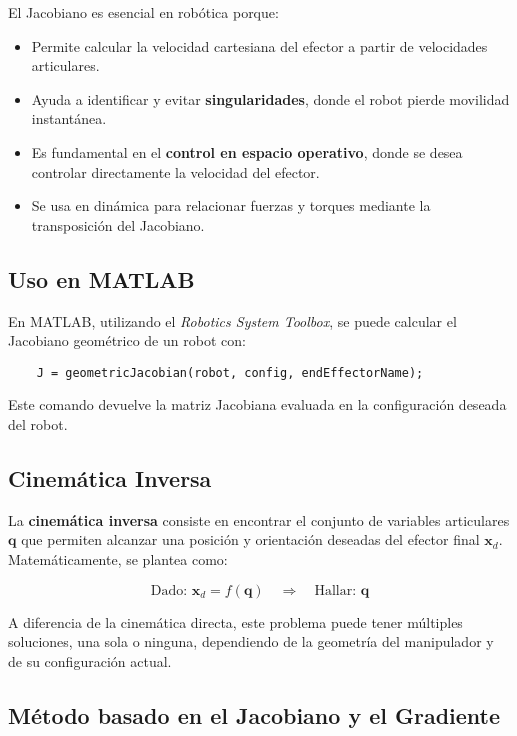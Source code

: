 El Jacobiano es esencial en robótica porque:
\begin{itemize}
	\item Permite calcular la velocidad cartesiana del efector a partir de velocidades articulares.
	\item Ayuda a identificar y evitar \textbf{singularidades}, donde el robot pierde movilidad instantánea.
	\item Es fundamental en el \textbf{control en espacio operativo}, donde se desea controlar directamente la velocidad del efector.
	\item Se usa en dinámica para relacionar fuerzas y torques mediante la transposición del Jacobiano.
\end{itemize}

\subsection*{Uso en MATLAB}

En MATLAB, utilizando el \textit{Robotics System Toolbox}, se puede calcular el Jacobiano geométrico de un robot con:

\begin{verbatim}
	J = geometricJacobian(robot, config, endEffectorName);
\end{verbatim}

Este comando devuelve la matriz Jacobiana evaluada en la configuración deseada del robot.


\subsection{Cinemática Inversa}


La \textbf{cinemática inversa} consiste en encontrar el conjunto de variables articulares $\boldsymbol{q}$ que permiten alcanzar una posición y orientación deseadas del efector final $\boldsymbol{x}_d$. Matemáticamente, se plantea como:

\[
\text{Dado: } \boldsymbol{x}_d = f(\boldsymbol{q}) \quad \Rightarrow \quad \text{Hallar: } \boldsymbol{q}
\]

A diferencia de la cinemática directa, este problema puede tener múltiples soluciones, una sola o ninguna, dependiendo de la geometría del manipulador y de su configuración actual.

\subsection*{Método basado en el Jacobiano y el Gradiente}

